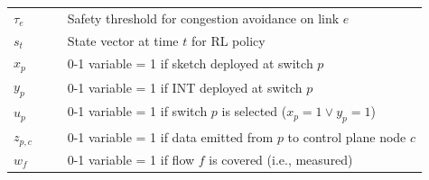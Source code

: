 \begin{table}[t]
{\begin{tabular}{p{0.13\linewidth}p{0.95\linewidth}}
$\tau_e$ & Safety threshold for congestion avoidance on link $e$ \\
$s_t$ & State vector at time $t$ for RL policy \\
$x_p$ & 0-1 variable = 1 if sketch deployed at switch $p$ \\
$y_p$ & 0-1 variable = 1 if INT deployed at switch $p$ \\
$u_p$ & 0-1 variable = 1 if switch $p$ is selected ($x_p=1 \lor y_p=1$) \\
$z_{p,c}$ & 0-1 variable = 1 if data emitted from $p$ to control plane node $c$ \\
$w_f$ & 0-1 variable = 1 if flow $f$ is covered (i.e., measured) \\
\bottomrule
\end{tabular}}
\end{table}


